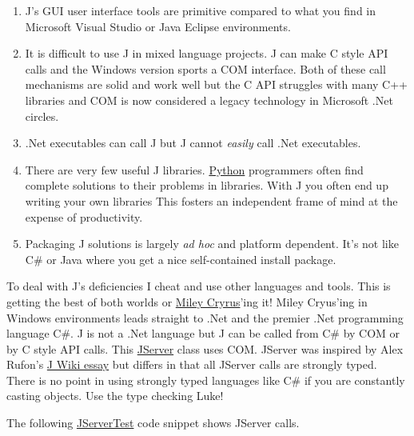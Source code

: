 \begin{enumerate}
\item
  J's GUI user interface tools are primitive compared to what you find
  in Microsoft Visual Studio or Java Eclipse environments.
\item
  It is difficult to use J in mixed language projects. J can make C
  style API calls and the Windows version sports a COM interface. Both
  of these call mechanisms are solid and work well but the C API
  struggles with many C++ libraries and COM is now considered a legacy
  technology in Microsoft .Net circles.
\item
  .Net executables can call J but J cannot \emph{easily} call .Net
  executables.
\item
  There are very few useful J libraries.
  \href{http://pypi.python.org/pypi/}{Python} programmers often find
  complete solutions to their problems in libraries. With J you often
  end up writing your own libraries This fosters an independent frame of
  mind at the expense of productivity.
\item
  Packaging J solutions is largely \emph{ad hoc} and platform dependent.
  It's not like C\# or Java where you get a nice self-contained install
  package.
\end{enumerate}
To deal with J's deficiencies I cheat and use other languages and tools.
This is getting the best of both worlds or
\href{http://www.stlyrics.com/lyrics/hannahmontana/bestofbothworlds.htm}{Miley
Cryrus}'ing it! Miley Cryus'ing in Windows environments leads straight
to .Net and the premier .Net programming language C\#. J is not a .Net
language but J can be called from C\# by COM or by C style API calls.
This
\href{http://cid-f964330e36001519.skydrive.live.com/self.aspx/Public/cs/JServer10may27.zip}{JServer}
class uses COM. JServer was inspired by Alex Rufon's
\href{http://202.67.223.49/jwiki/Guides/J\%20CSharp}{J Wiki essay} but
differs in that all JServer calls are strongly typed. There is no point
in using strongly typed languages like C\# if you are constantly casting
objects. Use the type checking Luke!

The following
\href{https://github.com/bakerjd99/jacks/tree/bdea475ea7fba0962f6c089d3f77b6ef675e18ca/jserver}{JServerTest}
code snippet shows JServer calls.


